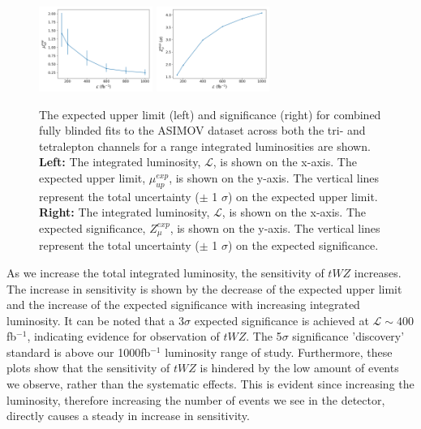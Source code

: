 \begin{figure}
    \centering
    \includegraphics[width=0.33\textwidth]{figures/combined/exp_upper.png}
    \includegraphics[width=0.33\textwidth]{figures/combined/signif.png}
    \caption{The expected upper limit (left) and significance (right) for combined fully blinded fits to the ASIMOV dataset across both the tri- and tetralepton channels for a range integrated luminosities are shown. \textbf{Left: }The integrated luminosity, $\mathcal{L}$, is shown on the x-axis. The expected upper limit, $\mu_{up}^{exp}$, is shown on the y-axis. The vertical lines represent the total uncertainty ($\pm$ 1 $\sigma$) on the expected upper limit. \textbf{Right: }The integrated luminosity, $\mathcal{L}$, is shown on the x-axis. The expected significance, $Z_{\mu}^{exp}$, is shown on the y-axis. The vertical lines represent the total uncertainty ($\pm$ 1 $\sigma$) on the expected significance.}
    \label{fig:limit-sig-projection}
\end{figure}

As we increase the total integrated luminosity, the sensitivity of $tWZ$ increases. The increase in sensitivity is shown by the decrease of the expected upper limit and the increase of the expected significance with increasing integrated luminosity. It can be noted that a 3$\sigma$ expected significance is achieved at $\mathcal{L} \sim 400$ fb$^{-1}$, indicating evidence for observation of $tWZ$. The 5$\sigma$ significance 'discovery' standard is above our 1000fb$^{-1}$ luminosity range of study. Furthermore, these plots show that the sensitivity of $tWZ$ is hindered by the low amount of events we observe, rather than the systematic effects. This is evident since increasing the luminosity, therefore increasing the number of events we see in the detector, directly causes a steady in increase in sensitivity.

